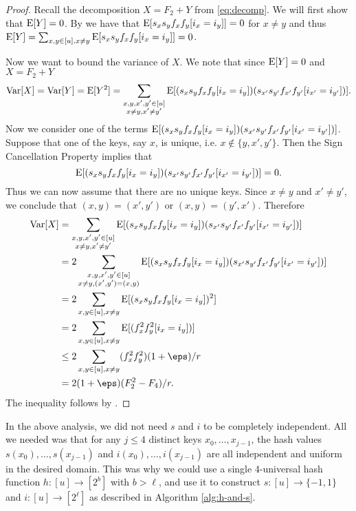 \begin{proof}
   Recall the decomposition $X=F_2+Y$ from \cref{eq:decomp}.
    We will first show that $\operatorname*{E}[Y] = 0$.
    By  we have that $\operatorname*{E}[s_x s_y f_x f_y [i_x = i_y]] = 0$
    for $x \neq y$ and thus $\operatorname*{E}[Y] = \sum_{x,y\in[u],x\neq y} \operatorname*{E}[s_x s_y f_x f_y [i_x = i_y]] = 0$.

    Now we want to bound the variance of $X$. We note that since $\operatorname*{E}[Y] = 0$ and $X = F_2 + Y$
    \begin{align*}
        \operatorname*{Var}[X] = \operatorname*{Var}[Y] = \operatorname*{E}[Y^2]
            = \sum_{\substack{x, y, x', y' \in [u]\\ x \neq y, x' \neq y'}} \operatorname*{E}[(s_x s_y f_x f_y [i_x = i_y])(s_{x'} s_{y'} f_{x'} f_{y'} [i_{x'} = i_{y'}])] .
    \end{align*}
    Now we consider one of the terms $\operatorname*{E}[(s_x s_y f_x f_y [i_x = i_y])(s_{x'} s_{y'} f_{x'} f_{y'} [i_{x'} = i_{y'}])]$.
    Suppose that one of the keys, say $x$, is unique, i.e. $x \not\in \{y, x', y'\}$.
    Then the Sign Cancellation Property implies that 
    \[
        \operatorname*{E}[(s_x s_y f_x f_y [i_x = i_y])(s_{x'} s_{y'} f_{x'} f_{y'} [i_{x'} = i_{y'}])] = 0 .
    \]
    Thus we can now assume that there are no unique keys. Since $x \neq y$ and $x' \neq y'$, we conclude
    that $(x, y) = (x', y')$ or $(x, y) = (y', x')$. Therefore
    \begin{align*}
       \Var[X] &= \sum_{\substack{x, y, x', y' \in [u]\\ x \neq y, x' \neq y'}}
                \E[(s_x s_y f_x f_y [i_x = i_y])(s_{x'} s_{y'} f_{x'} f_{y'} [i_{x'} = i_{y'}])]
            \\&= 2 \sum_{\substack{x, y, x', y' \in [u]\\ x \neq y, (x', y') = (x, y)}}
                \E[(s_x s_y f_x f_y [i_x = i_y])(s_{x'} s_{y'} f_{x'} f_{y'} [i_{x'} = i_{y'}])]
            \\&= 2\sum_{x,y\in[u],x\neq y} \E[(s_x s_y f_x f_y[i_x=i_y])^2]
            \\&= 2\sum_{x,y\in[u],x\neq y} \E[(f_x^2f_y^2[i_x=i_y])]
            \\&\le 2\sum_{x,y\in[u],x\neq y} (f_x^2f_y^2)(1 + \eps)/r
            \\&= 2(1 + \eps) (F_2^2-F_4)/r.
    \end{align*}
    The inequality follows by .
\end{proof}
In the above analysis, we
did not need $s$ and $i$ to be completely independent. All we needed
was that for any $j\leq 4$ distinct keys $x_0,\ldots,x_{j - 1}$, the hash
values $s(x_0),\ldots,s(x_{j - 1})$ and $i(x_0),\ldots,i(x_{j - 1})$ are all
independent and uniform in the desired domain. This was why we could
use a single 4-universal hash function $h:[u]\to[2^b]$ with
$b>\ell$, and use it to construct $s:[u]\to\{-1, 1\}$ and
$i:[u]\to[2^\ell]$ as described in Algorithm \ref{alg:h-and-s}.

